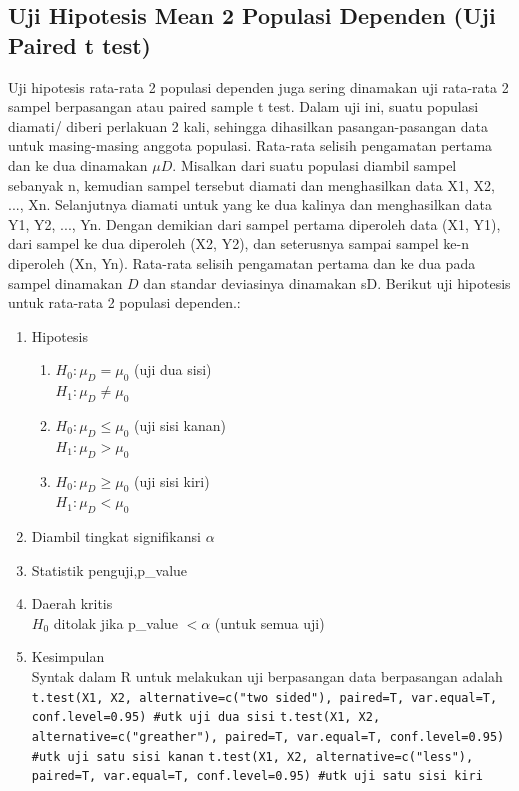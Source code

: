 \documentclass[a4paper,12pt]{article}
\begin{document}
\subsection{Uji Hipotesis Mean 2 Populasi Dependen (Uji Paired t test)}
Uji hipotesis rata-rata 2 populasi dependen juga sering dinamakan uji rata-rata 2 sampel berpasangan atau paired sample t test. Dalam uji ini, suatu populasi diamati/ diberi perlakuan 2 kali,
sehingga dihasilkan pasangan-pasangan data untuk masing-masing anggota populasi. Rata-rata selisih pengamatan pertama dan ke dua dinamakan $\mu D$. 
Misalkan dari suatu populasi diambil sampel sebanyak n, kemudian sampel tersebut diamati dan menghasilkan data X1, X2, ..., Xn. Selanjutnya diamati untuk yang ke dua kalinya dan menghasilkan
data Y1, Y2, ..., Yn. Dengan demikian dari sampel pertama diperoleh data (X1, Y1), dari sampel ke dua diperoleh (X2, Y2), dan seterusnya sampai sampel ke-n diperoleh (Xn, Yn). Rata-rata
selisih pengamatan pertama dan ke dua pada sampel dinamakan $D$ dan standar deviasinya dinamakan sD.
Berikut uji hipotesis untuk rata-rata 2 populasi dependen.:

\begin{enumerate}
    \item Hipotesis
        \begin{enumerate}[label = \alph*.]
            \item $H_{0} : \mu_{D} = \mu_{0}$ (uji dua sisi)\\
                $H_{1} : \mu_{D} \neq \mu_{0}$

            \item $H_{0} : \mu_{D} \leq \mu_{0}$ (uji sisi kanan)\\
                $H_{1} : \mu_{D} > \mu_{0}$

            \item $H_{0} : \mu_{D} \geq \mu_{0}$ (uji sisi kiri)\\
                $H_{1} : \mu_{D} < \mu_{0}$

        \end{enumerate}

    \item Diambil tingkat signifikansi $\alpha$

    \item Statistik penguji,p\_value

    \item Daerah kritis\\
        $H_{0}$ ditolak jika p\_value $< \alpha$ (untuk semua uji)
        
    \item Kesimpulan\\
Syntak dalam R untuk melakukan uji berpasangan data berpasangan adalah\\
\texttt {t.test(X1, X2, alternative=c("two sided"), paired=T, var.equal=T, conf.level=0.95) \#utk uji dua sisi}
\texttt {t.test(X1, X2, alternative=c("greather"),  paired=T, var.equal=T, conf.level=0.95) \#utk uji satu sisi kanan}
\texttt {t.test(X1, X2, alternative=c("less"),  paired=T, var.equal=T, conf.level=0.95) \#utk uji satu sisi kiri}
\end{enumerate}
\end{document}
